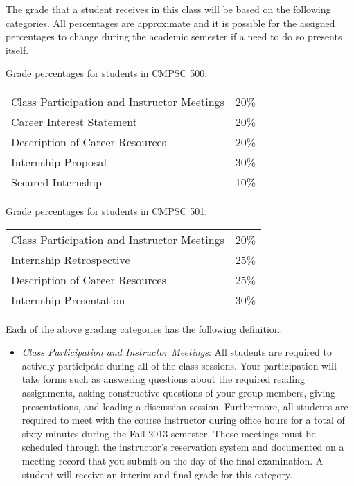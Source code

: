 The grade that a student receives in this class will be based on the following categories. All percentages are
approximate and it is possible for the assigned percentages to change during the academic semester if a need to do so
presents itself. 

Grade percentages for students in CMPSC 500:

\vspace{-.1in}
\begin{center}
\begin{tabular}{ll}
Class Participation and Instructor Meetings & 20\% \\
Career Interest Statement & 20\% \\
Description of Career Resources & 20\% \\
Internship Proposal & 30\% \\
Secured Internship & 10\% \\
\end{tabular}
\end{center}

Grade percentages for students in CMPSC 501:

\vspace{-.1in}
\begin{center}
\begin{tabular}{ll}
Class Participation and Instructor Meetings & 20\% \\
Internship Retrospective & 25\% \\
Description of Career Resources & 25\% \\
Internship Presentation & 30\% \\
\end{tabular}
\end{center}




Each of the above grading categories has the following definition:

\begin{itemize}

	\item {\em Class Participation and Instructor Meetings}: All students are required to actively participate during
		all of the class sessions. Your participation will take forms such as answering questions about the required
		reading assignments, asking constructive questions of your group members, giving presentations, and leading a
		discussion session. Furthermore, all students are required to meet with the course instructor during office
		hours for a total of sixty minutes during the Fall 2013 semester.  These meetings must be scheduled through the
		instructor's reservation system and documented on a meeting record that you submit on the day of the final
		examination. A student will receive an interim and final grade for this category.

	
\end{itemize}

